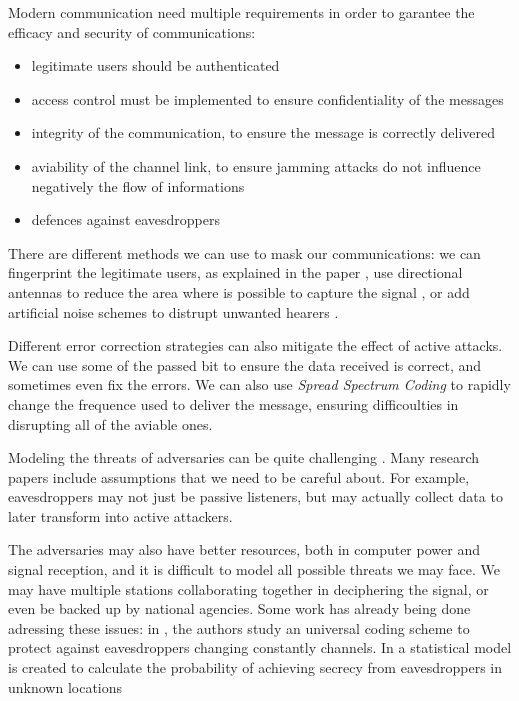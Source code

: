 Modern communication need multiple requirements in order to garantee the efficacy and security of communications:
\begin{itemize}
  \item legitimate users should be authenticated
  \item access control must be implemented to ensure confidentiality of the messages
  \item integrity of the communication, to ensure the message is correctly delivered
  \item aviability of the channel link, to ensure jamming attacks do not influence negatively the flow of informations
  \item defences against eavesdroppers
\end{itemize}

There are different methods we can use to mask our communications: we can fingerprint the legitimate users, as explained in the paper \cite{228fe14543ce4cefba3bb9cc11741362}, use directional antennas to reduce the area where is possible to capture the signal \cite{4543070}, or add artificial noise schemes to distrupt unwanted hearers \cite{1605889}.

Different error correction strategies can also mitigate the effect of active attacks. We can use some of the passed bit to ensure the data received is correct, and sometimes even fix the errors. We can also use \textit{Spread Spectrum Coding} to rapidly change the frequence used to deliver the message, ensuring difficoulties in disrupting all of the aviable ones.


Modeling the threats of adversaries can be quite challenging \cite{7120011}. Many research papers include assumptions that we need to be careful about. For example, eavesdroppers may not just be passive listeners, but may actually collect data to later transform into active attackers.

The adversaries may also have better resources, both in computer power and signal reception, and it is difficult to model all possible threats we may face. We may have multiple stations collaborating together in deciphering the signal, or even be backed up by national agencies. Some work has already being done adressing these issues: in \cite{5707054}, the authors study an universal coding scheme to protect against eavesdroppers changing constantly channels. In \cite{7543509} a statistical model is created to calculate the probability of achieving secrecy from eavesdroppers in unknown locations

